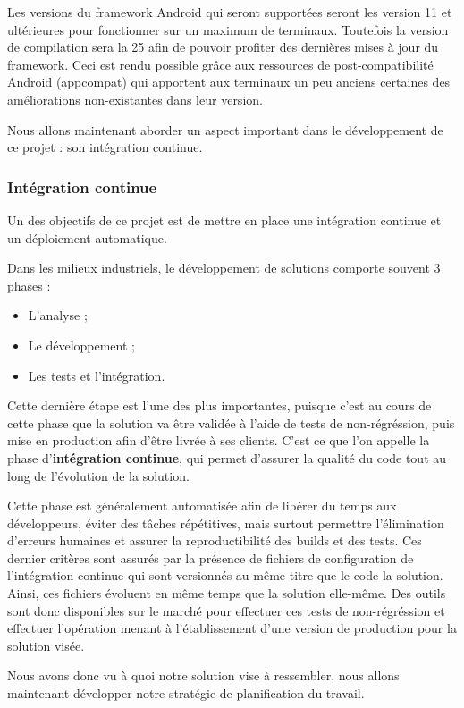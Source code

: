 Les versions du framework Android qui seront supportées seront les version 11 et ultérieures pour fonctionner sur un maximum de terminaux. Toutefois la version de compilation sera la 25 afin de pouvoir profiter des dernières mises à jour du framework. Ceci est rendu possible grâce aux ressources de post-compatibilité Android (appcompat) qui apportent aux terminaux un peu anciens certaines des améliorations non-existantes dans leur version.

Nous allons maintenant aborder un aspect important dans le développement de ce projet : son intégration continue.

\subsubsection{Intégration continue}

Un des objectifs de ce projet est de mettre en place une intégration continue et un déploiement automatique.

Dans les milieux industriels, le développement de solutions comporte souvent 3 phases :
\begin{itemize}
    \item L'analyse ;
    \item Le développement ;
    \item Les tests et l'intégration.
\end{itemize}

Cette dernière étape est l'une des plus importantes, puisque c'est au cours de cette phase que la solution va être validée à l'aide de tests de non-régréssion, puis mise en production afin d'être livrée à ses clients. C'est ce que l'on appelle la phase d'\textbf{intégration continue}, qui permet d'assurer la qualité du code tout au long de l'évolution de la solution.

Cette phase est généralement automatisée afin de libérer du temps aux développeurs, éviter des tâches répétitives, mais surtout permettre l'élimination d'erreurs humaines et assurer la reproductibilité des builds et des tests. Ces dernier critères sont assurés par la présence de fichiers de configuration de l'intégration continue qui sont versionnés au même titre que le code la solution. Ainsi, ces fichiers évoluent en même temps que la solution elle-même.
Des outils sont donc disponibles sur le marché pour effectuer ces tests de non-régréssion et effectuer l'opération menant à l'établissement d'une version de production pour la solution visée.

Nous avons donc vu à quoi notre solution vise à ressembler, nous allons maintenant développer notre stratégie de planification du travail.

